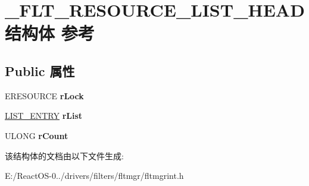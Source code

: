 \hypertarget{struct___f_l_t___r_e_s_o_u_r_c_e___l_i_s_t___h_e_a_d}{}\section{\+\_\+\+F\+L\+T\+\_\+\+R\+E\+S\+O\+U\+R\+C\+E\+\_\+\+L\+I\+S\+T\+\_\+\+H\+E\+A\+D结构体 参考}
\label{struct___f_l_t___r_e_s_o_u_r_c_e___l_i_s_t___h_e_a_d}
\subsection*{Public 属性}
\begin{DoxyCompactItemize}
\item 
\mbox{\label{struct___f_l_t___r_e_s_o_u_r_c_e___l_i_s_t___h_e_a_d_a862e3eac0711ac5b128203f2e64576f9}} 
E\+R\+E\+S\+O\+U\+R\+CE {\bfseries r\+Lock}
\item 
\mbox{\label{struct___f_l_t___r_e_s_o_u_r_c_e___l_i_s_t___h_e_a_d_acd018690212cdd944fba40462ed7b19e}} 
\hyperlink{struct___l_i_s_t___e_n_t_r_y}{L\+I\+S\+T\+\_\+\+E\+N\+T\+RY} {\bfseries r\+List}
\item 
\mbox{\label{struct___f_l_t___r_e_s_o_u_r_c_e___l_i_s_t___h_e_a_d_abbcd2471056c763bd361da5932c758aa}} 
U\+L\+O\+NG {\bfseries r\+Count}
\end{DoxyCompactItemize}


该结构体的文档由以下文件生成\+:\begin{DoxyCompactItemize}
\item 
E\+:/\+React\+O\+S-\/0../drivers/filters/fltmgr/fltmgrint.\+h\end{DoxyCompactItemize}
